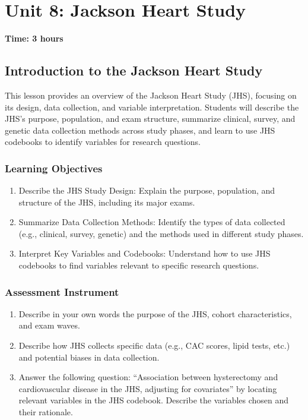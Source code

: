 \chapter{Unit 8: Jackson Heart Study}
\label{chap:unit8}

\textbf{Time: 3 hours}

\section{Introduction to the Jackson Heart Study}
\label{sec:JHS}

This lesson provides an overview of the Jackson Heart Study (JHS), focusing on its design, data collection, and variable interpretation. Students will describe the JHS's purpose, population, and exam structure, summarize clinical, survey, and genetic data collection methods across study phases, and learn to use JHS codebooks to identify variables for research questions.

\subsection{Learning Objectives}

\begin{enumerate}
    \item Describe the JHS Study Design: Explain the purpose, population, and structure of the JHS, including its major exams.
    \item Summarize Data Collection Methods: Identify the types of data collected (e.g., clinical, survey, genetic) and the methods used in different study phases.
    \item Interpret Key Variables and Codebooks: Understand how to use JHS codebooks to find variables relevant to specific research questions.
\end{enumerate}

\subsection{Assessment Instrument}

\begin{enumerate}
    \item Describe in your own words the purpose of the JHS, cohort characteristics, and exam waves.
    \item Describe how JHS collects specific data (e.g., CAC scores, lipid tests, etc.) and potential biases in data collection.
    \item Answer the following question: ``Association between hysterectomy and cardiovascular disease in the JHS, adjusting for covariates'' by locating relevant variables in the JHS codebook. Describe the variables chosen and their rationale.
\end{enumerate}


